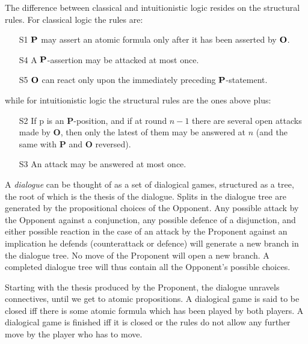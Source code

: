 \documentclass{article}
\begin{document}
The difference between classical and intuitionistic logic resides on the  structural rules.
For classical logic the rules are:
\begin{itemize}
\item[S1] $\bf P$ may assert an atomic formula only after it has been asserted by $\bf O$.
\iffalse
\item[S2] If p is an $\bf P$-position, and if at round $n - 1$ there are several open attacks made by $\bf O$, then only the latest of them may be answered at $n$ (and the same with $\bf P$ and $\bf O$ reversed). 
\item[S3] An attack may be answered at most once.
\fi
\item[S4] A $\bf P$-assertion may be attacked at most once.
\item[S5] $\bf O$ can react only upon the immediately preceding $\bf P$-statement. 
\end{itemize}
while for intuitionistic logic the structural rules are the ones above plus:
 \begin{itemize}
\item[S2] If p is an {\bf P}-position, and if at round $n - 1$ there are several open attacks made by {\bf O}, then only the 
latest of them may be answered at $n$ (and the same with {\bf P} and {\bf O} reversed). 
\item[S3] An attack may be answered at most once.
\end{itemize}


A {\em dialogue} can be thought of as a set of dialogical games, structured as a tree, the root of which is the thesis of the dialogue. Splits in the dialogue tree are generated by the propositional choices of the Opponent. Any possible attack by the Opponent against a conjunction, any possible defence of a disjunction, and either possible reaction in the case of an attack by the Proponent against an implication he defends (counterattack or defence) will generate a new branch in the dialogue tree. No move of the Proponent will open a new branch. A completed dialogue tree will thus contain all the Opponent's possible choices.

Starting with the thesis produced by the Proponent, the dialogue unravels connectives, until we get to atomic propositions. A dialogical game  is said to be closed iff there is some atomic formula which has been played by both players. A dialogical game is finished iff it is closed or the rules do not allow any further move by the player who has to move.
\end{document}
